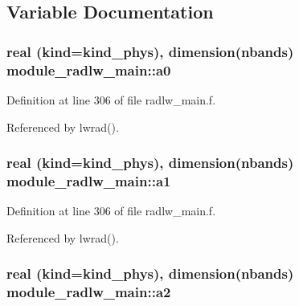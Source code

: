 \subsection{Variable Documentation}
\subsubsection[{\texorpdfstring{a0}{a0}}]{\setlength{\rightskip}{0pt plus 5cm}real (kind=kind\+\_\+phys), dimension(nbands) module\+\_\+radlw\+\_\+main\+::a0\hspace{0.3cm}{\ttfamily [private]}}\hypertarget{namespacemodule__radlw__main_ae55000724e738b7a5b7be4c8cef07553}{}\label{namespacemodule__radlw__main_ae55000724e738b7a5b7be4c8cef07553}


Definition at line 306 of file radlw\+\_\+main.\+f.



Referenced by lwrad().

\subsubsection[{\texorpdfstring{a1}{a1}}]{\setlength{\rightskip}{0pt plus 5cm}real (kind=kind\+\_\+phys), dimension(nbands) module\+\_\+radlw\+\_\+main\+::a1\hspace{0.3cm}{\ttfamily [private]}}\hypertarget{namespacemodule__radlw__main_aeba888f00b19a65460f3b587c60ea4a0}{}\label{namespacemodule__radlw__main_aeba888f00b19a65460f3b587c60ea4a0}


Definition at line 306 of file radlw\+\_\+main.\+f.



Referenced by lwrad().

\subsubsection[{\texorpdfstring{a2}{a2}}]{\setlength{\rightskip}{0pt plus 5cm}real (kind=kind\+\_\+phys), dimension(nbands) module\+\_\+radlw\+\_\+main\+::a2\hspace{0.3cm}{\ttfamily [private]}}\hypertarget{namespacemodule__radlw__main_a1b4681c9bcc9434e30fef0ca4aaa9dcd}{}\label{namespacemodule__radlw__main_a1b4681c9bcc9434e30fef0ca4aaa9dcd}


